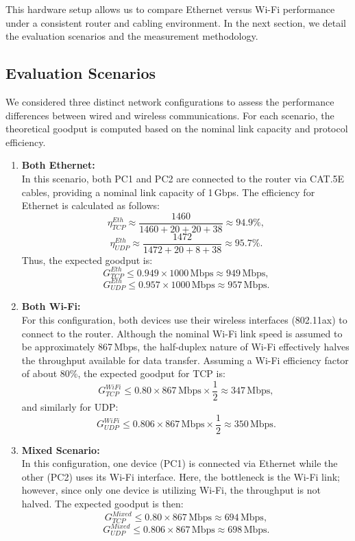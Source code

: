 This hardware setup allows us to compare Ethernet versus Wi-Fi performance under a consistent router and cabling environment. In the next section, we detail the evaluation scenarios and the measurement methodology.

\subsection{Evaluation Scenarios} \label{subsec:evaluation-scenarios}

We considered three distinct network configurations to assess the performance differences between wired and wireless communications. For each scenario, the theoretical goodput is computed based on the nominal link capacity and protocol efficiency.

\begin{enumerate}
    \item \textbf{Both Ethernet:} \\
    In this scenario, both PC1 and PC2 are connected to the router via CAT.5E cables, providing a nominal link capacity of 1\,Gbps. The efficiency for Ethernet is calculated as follows:
    \[
    \eta_{TCP}^{Eth} \approx \frac{1460}{1460 + 20 + 20 + 38} \approx 94.9\%,
    \]
    \[
    \eta_{UDP}^{Eth} \approx \frac{1472}{1472 + 20 + 8 + 38} \approx 95.7\%.
    \]
    Thus, the expected goodput is:
    \[
    G_{TCP}^{Eth} \leq 0.949 \times 1000\,\text{Mbps} \approx 949\,\text{Mbps},
    \]
    \[
    G_{UDP}^{Eth} \leq 0.957 \times 1000\,\text{Mbps} \approx 957\,\text{Mbps}.
    \]

    \item \textbf{Both Wi-Fi:} \\
    For this configuration, both devices use their wireless interfaces (802.11ax) to connect to the router. Although the nominal Wi-Fi link speed is assumed to be approximately 867\,Mbps, the half-duplex nature of Wi-Fi effectively halves the throughput available for data transfer. Assuming a Wi-Fi efficiency factor of about 80\%, the expected goodput for TCP is:
    \[
    G_{TCP}^{WiFi} \leq 0.80 \times 867\,\text{Mbps} \times \frac{1}{2} \approx 347\,\text{Mbps},
    \]
    and similarly for UDP:
    \[
    G_{UDP}^{WiFi} \leq 0.806 \times 867\,\text{Mbps} \times \frac{1}{2} \approx 350\,\text{Mbps}.
    \]

    \item \textbf{Mixed Scenario:} \\
    In this configuration, one device (PC1) is connected via Ethernet while the other (PC2) uses its Wi-Fi interface. Here, the bottleneck is the Wi-Fi link; however, since only one device is utilizing Wi-Fi, the throughput is not halved. The expected goodput is then:
    \[
    G_{TCP}^{Mixed} \leq 0.80 \times 867\,\text{Mbps} \approx 694\,\text{Mbps},
    \]
    \[
    G_{UDP}^{Mixed} \leq 0.806 \times 867\,\text{Mbps} \approx 698\,\text{Mbps}.
    \]
\end{enumerate}

